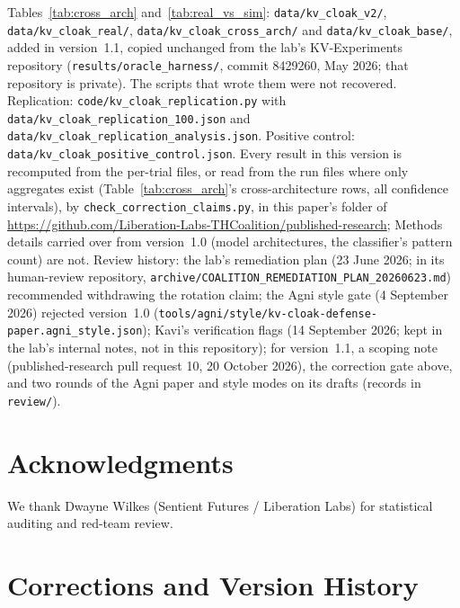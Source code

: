 \documentclass[11pt,a4paper]{article}
\begin{document}
{\raggedright
Tables~\ref{tab:cross_arch} and~\ref{tab:real_vs_sim}:
\nolinkurl{data/kv_cloak_v2/}, \nolinkurl{data/kv_cloak_real/},
\nolinkurl{data/kv_cloak_cross_arch/} and \nolinkurl{data/kv_cloak_base/},
added in version~1.1, copied unchanged from the lab's KV-Experiments
repository (\nolinkurl{results/oracle_harness/}, commit 8429260, May 2026;
that repository is private). The scripts that wrote them were not
recovered. Replication: \nolinkurl{code/kv_cloak_replication.py} with
\nolinkurl{data/kv_cloak_replication_100.json} and
\nolinkurl{data/kv_cloak_replication_analysis.json}. Positive control:
\nolinkurl{data/kv_cloak_positive_control.json}. Every result in this
version is recomputed from the per-trial files, or read from the run
files where only aggregates exist (Table~\ref{tab:cross_arch}'s
cross-architecture rows, all confidence intervals), by
\nolinkurl{check_correction_claims.py}, in this paper's folder of
\url{https://github.com/Liberation-Labs-THCoalition/published-research};
Methods details carried over from version~1.0 (model architectures, the
classifier's pattern count) are not.
Review history: the lab's remediation plan (23 June 2026; in its
human-review repository,
\nolinkurl{archive/COALITION_REMEDIATION_PLAN_20260623.md}) recommended
withdrawing the rotation claim; the Agni style gate (4 September 2026)
rejected version~1.0
(\nolinkurl{tools/agni/style/kv-cloak-defense-paper.agni_style.json});
Kavi's verification flags (14 September 2026; kept in the lab's internal
notes, not in this repository); for version~1.1, a scoping note
(published-research pull request 10, 20 October 2026), the correction gate
above, and two rounds of the Agni paper and style modes on its drafts
(records in \nolinkurl{review/}).\par}


\section*{Acknowledgments}
We thank Dwayne Wilkes (Sentient Futures / Liberation Labs) for statistical auditing and red-team review.



\appendix
\sloppy

\section{Corrections and Version History}
\label{sec:corrections}
\end{document}
